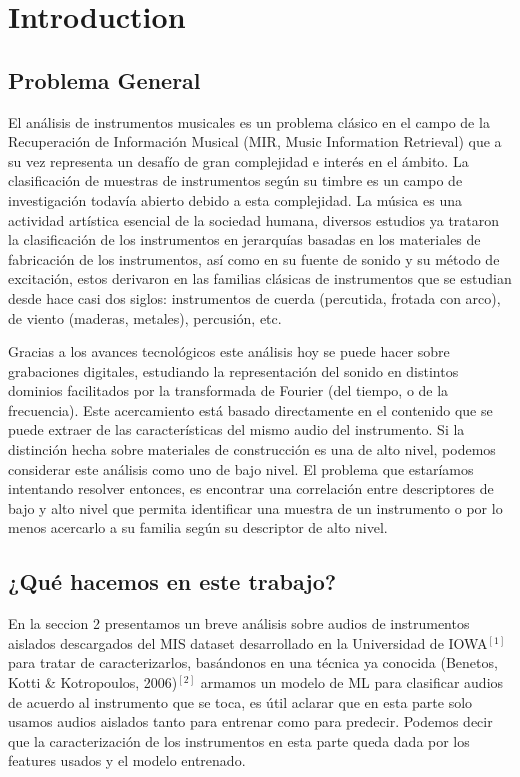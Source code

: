\section{Introduction}

\subsection{Problema General}

El análisis de instrumentos musicales es un problema clásico en el campo de la Recuperación de Información Musical (MIR, Music Information Retrieval) que a su vez representa un desafío de gran complejidad e interés en el ámbito. La clasificación de muestras de instrumentos según su timbre es un campo de investigación todavía abierto debido a esta complejidad. La música es una actividad artística esencial de la sociedad humana, diversos estudios ya trataron la clasificación de los instrumentos en jerarquías basadas en los materiales de fabricación de los instrumentos, así como en su fuente de sonido y su método de excitación, estos derivaron en las familias clásicas de instrumentos que se estudian desde hace casi dos siglos: instrumentos de cuerda (percutida, frotada con arco), de viento (maderas, metales), percusión, etc.

Gracias a los avances tecnológicos este análisis hoy se puede hacer sobre grabaciones digitales, estudiando la representación del sonido en distintos dominios facilitados por la transformada de Fourier (del tiempo, o de la frecuencia). Este acercamiento está basado directamente en el contenido que se puede extraer de las características del mismo audio del instrumento. Si la distinción hecha sobre materiales de construcción es una de alto nivel, podemos considerar este análisis como uno de bajo nivel. El problema que estaríamos intentando resolver entonces, es encontrar una correlación entre descriptores de bajo y alto nivel que permita identificar una muestra de un instrumento o por lo menos acercarlo a su familia según su descriptor de alto nivel.
        
\subsection{¿Qué hacemos en este trabajo?}

En la seccion 2 presentamos un breve análisis sobre audios de instrumentos aislados descargados del MIS dataset desarrollado en la Universidad de IOWA$^{[1]}$ para tratar de caracterizarlos, basándonos en una t\'ecnica ya conocida (Benetos, Kotti \& Kotropoulos, 2006)$^{[2]}$ armamos un modelo de ML para clasificar audios de acuerdo al instrumento que se toca, es útil aclarar que en esta parte solo usamos audios aislados tanto para entrenar como para predecir. Podemos decir que la caracterización de los instrumentos en esta parte queda dada por los features usados y el modelo entrenado.

